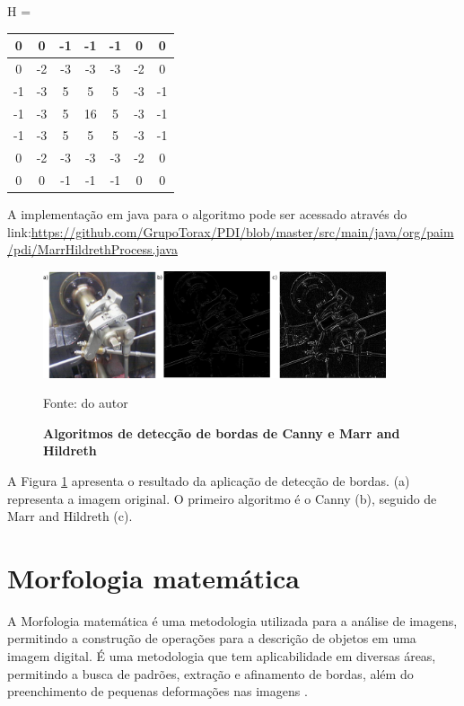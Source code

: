 \documentclass[
	12pt,				%
	oneside,			%
	a4paper,			%
	english,			%
	french,				%
	spanish,			%
	brazil,				%
	]{abntex2}
\begin{document}
\begin{center}
H = 
\begin{tabular}{|c|c|c|c|c|c|c|}
    \hline
     0 &  0 & -1 & -1 & -1 &  0 &  0            \\ \hline
     0 & -2 & -3 & -3 & -3 & -2 &  0            \\ \hline
    -1 & -3 &  5 &  5 &  5 & -3 & -1            \\ \hline
    -1 & -3 &  5 & 16 &  5 & -3 & -1            \\ \hline
    -1 & -3 &  5 &  5 &  5 & -3 & -1            \\ \hline
     0 & -2 & -3 & -3 & -3 & -2 &  0            \\ \hline
     0 &  0 & -1 & -1 & -1 &  0 &  0            \\ \hline     
\end{tabular}
\end{center}

A implementação em java para o algoritmo pode ser acessado através do link:\url{https://github.com/GrupoTorax/PDI/blob/master/src/main/java/org/paim/pdi/MarrHildrethProcess.java}

\begin{figure}[ht]
\centering
\caption{\textbf{Algoritmos de detecção de bordas de Canny e Marr and Hildreth}}
\includegraphics[width=0.9\textwidth]{imagens/deteccao_bordas2.png}

Fonte: do autor
\label{fig:deteccao_bordas2}
\end{figure}

A Figura \ref{fig:deteccao_bordas2} apresenta o resultado da aplicação de detecção de bordas. (a) representa a imagem original. O primeiro algoritmo é o Canny (b), seguido de Marr and Hildreth (c).

\section{Morfologia matemática}

A Morfologia matemática é uma metodologia utilizada para a análise de imagens, permitindo a construção de operações para a descrição de objetos em uma imagem digital.  É uma metodologia que tem aplicabilidade em diversas áreas, permitindo a busca de padrões, extração e afinamento de bordas, além do preenchimento de pequenas deformações nas imagens \cite{pedriniSchwartz:2008}.
\end{document}
